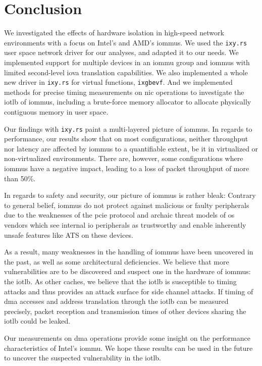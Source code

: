 \chapter{Conclusion}
\label{chap:conclusion}

We investigated the effects of hardware isolation in high-speed network
environments with a focus on Intel's and AMD's \acp{iommu}. We used the
\texttt{ixy.rs} user space network driver for our analyses, and adapted it to
our needs. We implemented support for multiple devices in an \ac{iommu} group
and \acp{iommu} with limited second-level \ac{iova} translation capabilities. We
also implemented a whole new driver in \texttt{ixy.rs} for virtual functions,
\texttt{ixgbevf}. And we implemented methods for precise timing measurements on
\ac{nic} operations to investigate the \ac{iotlb} of \acp{iommu}, including a
brute-force memory allocator to allocate physically contiguous memory in user
space.

Our findings with \texttt{ixy.rs} paint a multi-layered picture of \acp{iommu}.
In regards to performance, our results show that on most configurations, neither
throughput nor latency are affected by \acp{iommu} to a quantifiable extent, be
it in virtualized or non-virtualized environments. There are, however, some
configurations where \acp{iommu} have a negative impact, leading to a loss of
packet throughput of more than 50\%.

In regards to safety and security, our picture of \acp{iommu} is rather bleak:
Contrary to general belief, \acp{iommu} do not protect against malicious or
faulty peripherals due to the weaknesses of the \ac{pcie} protocol and archaic
threat models of \ac{os} vendors which see internal \ac{io} peripherals as
trustworthy and enable inherently unsafe features like ATS on these devices.

As a result, many weaknesses in the handling of \acp{iommu} have been uncovered
in the past, as well as some architectural deficiencies. We believe that more
vulnerabilities are to be discovered and suspect one in the hardware of
\acp{iommu}: the \ac{iotlb}. As other caches, we believe that the \ac{iotlb} is
susceptible to timing attacks and thus provides an attack surface for side
channel attacks. If timing of \ac{dma} accesses and address translation through
the \ac{iotlb} can be measured precisely, packet reception and transmission
times of other devices sharing the \ac{iotlb} could be leaked.

Our measurements on \ac{dma} operations provide some insight on the performance
characteristics of Intel's \ac{iommu}. We hope these results can be used in the
future to uncover the suspected vulnerability in the \ac{iotlb}.

